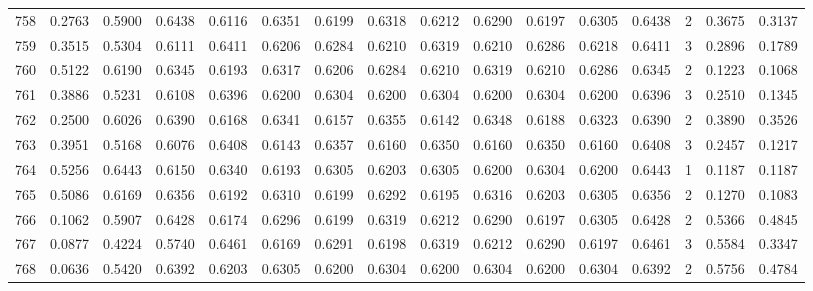 \begin{tabular}{lrrrrrrrrrrrrrrr}
758 &      0.2763 &  0.5900 &  0.6438 &  0.6116 &  0.6351 &  0.6199 &  0.6318 &  0.6212 &  0.6290 &  0.6197 &   0.6305 &     0.6438 &      2 &                    0.3675 &                     0.3137 \\
759 &      0.3515 &  0.5304 &  0.6111 &  0.6411 &  0.6206 &  0.6284 &  0.6210 &  0.6319 &  0.6210 &  0.6286 &   0.6218 &     0.6411 &      3 &                    0.2896 &                     0.1789 \\
760 &      0.5122 &  0.6190 &  0.6345 &  0.6193 &  0.6317 &  0.6206 &  0.6284 &  0.6210 &  0.6319 &  0.6210 &   0.6286 &     0.6345 &      2 &                    0.1223 &                     0.1068 \\
761 &      0.3886 &  0.5231 &  0.6108 &  0.6396 &  0.6200 &  0.6304 &  0.6200 &  0.6304 &  0.6200 &  0.6304 &   0.6200 &     0.6396 &      3 &                    0.2510 &                     0.1345 \\
762 &      0.2500 &  0.6026 &  0.6390 &  0.6168 &  0.6341 &  0.6157 &  0.6355 &  0.6142 &  0.6348 &  0.6188 &   0.6323 &     0.6390 &      2 &                    0.3890 &                     0.3526 \\
763 &      0.3951 &  0.5168 &  0.6076 &  0.6408 &  0.6143 &  0.6357 &  0.6160 &  0.6350 &  0.6160 &  0.6350 &   0.6160 &     0.6408 &      3 &                    0.2457 &                     0.1217 \\
764 &      0.5256 &  0.6443 &  0.6150 &  0.6340 &  0.6193 &  0.6305 &  0.6203 &  0.6305 &  0.6200 &  0.6304 &   0.6200 &     0.6443 &      1 &                    0.1187 &                     0.1187 \\
765 &      0.5086 &  0.6169 &  0.6356 &  0.6192 &  0.6310 &  0.6199 &  0.6292 &  0.6195 &  0.6316 &  0.6203 &   0.6305 &     0.6356 &      2 &                    0.1270 &                     0.1083 \\
766 &      0.1062 &  0.5907 &  0.6428 &  0.6174 &  0.6296 &  0.6199 &  0.6319 &  0.6212 &  0.6290 &  0.6197 &   0.6305 &     0.6428 &      2 &                    0.5366 &                     0.4845 \\
767 &      0.0877 &  0.4224 &  0.5740 &  0.6461 &  0.6169 &  0.6291 &  0.6198 &  0.6319 &  0.6212 &  0.6290 &   0.6197 &     0.6461 &      3 &                    0.5584 &                     0.3347 \\
768 &      0.0636 &  0.5420 &  0.6392 &  0.6203 &  0.6305 &  0.6200 &  0.6304 &  0.6200 &  0.6304 &  0.6200 &   0.6304 &     0.6392 &      2 &                    0.5756 &                     0.4784 \\

\end{tabular}
